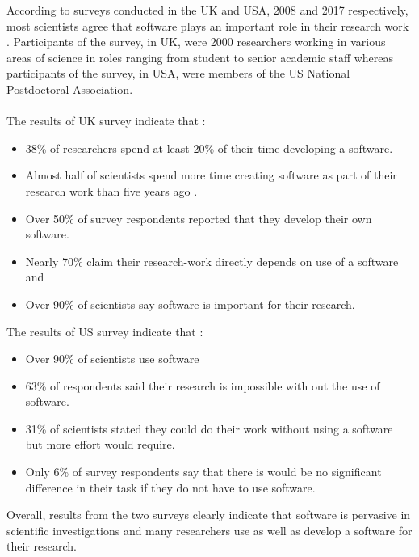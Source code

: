 According to surveys conducted in the UK and USA, 2008 and 2017 respectively, most scientists agree that software plays an important role in their research work \citep{hettrick2014uk, nangia2017track}. Participants of the survey, in UK, were 2000 researchers working in various areas of science in roles ranging from student to senior academic staff whereas participants of the survey, in USA, were members of the US National Postdoctoral Association. \\ \\
 
\noindent The results of UK survey indicate that \citep{hettrick2014uk}:
\begin{itemize}%
	\itemsep0em 
	\item 38\% of researchers spend at least 20\% of their time developing a software.
	\item Almost half of scientists spend more time creating software as part of their research work than five years ago .
	\item Over 50\% of survey respondents reported that they develop their own software. 
	\item Nearly 70\% claim their research-work directly depends on use of a software and
	\item Over 90\% of scientists say software is important for their research. \\
\end{itemize}

\noindent The results of US survey indicate that \citep{nangia2017track}:
\begin{itemize}%
	\itemsep0em
	\item Over 90\% of scientists use software 
	\item 63\% of respondents said their research is impossible with out the use of software.
	\item 31\% of scientists stated they could do their work without using a software but more effort would require.
	\item Only 6\% of survey respondents say that there is would be no significant difference in their task if they do not have to use software. 
	
\end{itemize}

Overall, results from the two surveys clearly indicate that software is pervasive in scientific investigations and many researchers use as well as develop a software for their research. \\

